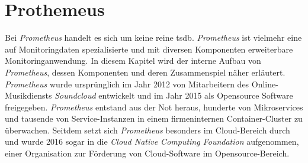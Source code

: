\documentclass[titlepage]{report}
\begin{document}
\section*{Prothemeus}
Bei \emph{Prometheus} handelt es sich um keine reine \gls{tsdb}.
\emph{Prometheus} ist vielmehr eine auf Monitoringdaten spezialisierte
und mit diversen Komponenten erweiterbare Monitoringanwendung. In diesem
Kapitel wird der interne Aufbau von \emph{Prometheus}, dessen
Komponenten und deren Zusammenspiel näher erläutert. \emph{Prometheus}
wurde ursprünglich im Jahr 2012 von Mitarbeitern des Online-Musikdiensts
\emph{Soundcloud} entwickelt\cite{PROMETHEUS_OVERVIEW} und im Jahr 2015
als Opensource Software freigegeben. \emph{Prometheus} entstand aus der
Not heraus, hunderte von Mikroservices und tausende von Service\hyp{}Instanzen
in einem firmeninternen Container\hyp{}Cluster zu
überwachen\cite{PROMETHEUS_YOUTUBE}. Seitdem setzt sich
\emph{Prometheus} besonders im Cloud\hyp{}Bereich durch und wurde 2016
sogar in die \emph{Cloud Native Computing Foundation}
aufgenommen\cite{CNCF}, einer Organisation zur Förderung von
Cloud\hyp{}Software im Opensource\hyp{}Bereich.
\end{document}
